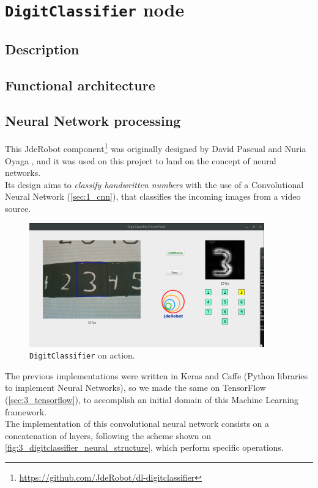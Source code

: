 \chapter{\texttt{DigitClassifier} node}
	\label{chap:4_digitclassifier}
	\section{Description}
	\section{Functional architecture}
	\section{Neural Network processing}
		This JdeRobot component\footnote{\url{https://github.com/JdeRobot/dl-digitclassifier}} was originally designed by David Pascual \cite{dpascualhe} and Nuria Oyaga \cite{noyaga}, and it was used on this project to land on the concept of neural networks.\\
		
		Its design aims to \textit{classify handwritten numbers} with the use of a Convolutional Neural Network (\autoref{sec:1_cnn}), that classifies the incoming images from a video source.\\
		
		\begin{figure}[h]
			\centering
			\includegraphics[width=4in]{images/digitclassifier}
			\caption{\texttt{DigitClassifier} on action.}
			\label{fig:4_digitclassifier}
		\end{figure}
			
			The previous implementations were written in Keras and Caffe (Python libraries to implement Neural Networks), so we made the same on TensorFlow (\autoref{sec:3_tensorflow}), to accomplish an initial domain of this Machine Learning framework.\\
			
			The implementation of this convolutional neural network consists on a concatenation of layers, following the scheme shown on \autoref{fig:3_digitclassifier_neural_structure}, which perform specific operations.
			
